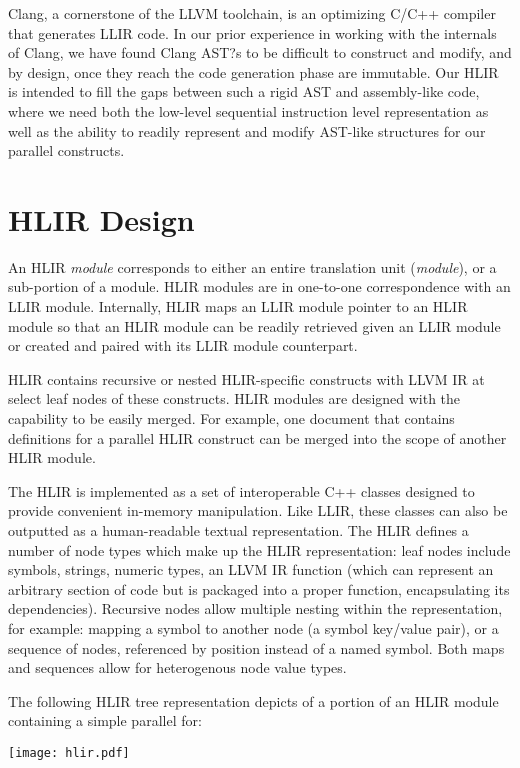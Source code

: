 \documentclass[12pt]{article}
\begin{document}
Clang, a cornerstone of the LLVM toolchain, is an optimizing C/C++ compiler that generates LLIR code. In our prior experience in working with the internals of Clang, we have found Clang AST?s to be difficult to construct and modify, and by design, once they reach the code generation phase are immutable. Our HLIR is intended to fill the gaps between such a rigid AST and assembly-like code, where we need both the low-level sequential instruction level representation as well as the ability to readily represent and modify AST-like structures for our parallel constructs.

\section{HLIR Design}

An HLIR {\it module} corresponds to either an entire translation unit ({\it module}), or a sub-portion of a module. HLIR modules are in one-to-one correspondence with an LLIR module. Internally, HLIR maps an LLIR module pointer to an HLIR module so that an HLIR module can be readily retrieved given an LLIR module or created and paired with its LLIR module counterpart.

HLIR contains recursive or nested HLIR-specific constructs with LLVM IR at select leaf nodes of these constructs. HLIR modules are designed with the capability to be easily merged. For example, one document that contains definitions for a parallel HLIR construct can be merged into the scope of another HLIR module.

The HLIR is implemented as a set of interoperable C++ classes designed to provide convenient in-memory manipulation. Like LLIR, these classes can also be outputted as a human-readable textual representation. The HLIR defines a number of node types which make up the HLIR representation: leaf nodes include symbols, strings, numeric types, an LLVM IR function (which can represent an arbitrary section of code but is packaged into a proper function, encapsulating its dependencies). Recursive nodes allow multiple nesting within the representation, for example: mapping a symbol to another node (a symbol key/value pair), or a sequence of nodes, referenced by position
instead of a named symbol. Both maps and sequences allow for heterogenous node value types.

The following HLIR tree representation depicts of a portion of an HLIR module containing a simple parallel for:

\texttt{[image: hlir.pdf]}
\end{document}
